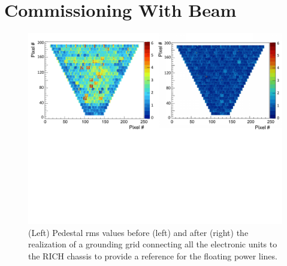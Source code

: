 \documentclass[final,5p,times,twocolumn]{elsarticle}
\begin{document}
\section{Commissioning With Beam}

\begin{figure}[t]
\begin{center}
\includegraphics[width=1.0\columnwidth]{EPS/Grounding.pdf}
\end{center}
\caption{(Left) Pedestal rms values before (left) and after (right) the realization of a grounding
grid connecting all the electronic units to the RICH chassis to provide a reference for the 
floating power lines.}
\label{Fig:GroundG}
\end{figure}
\end{document}
